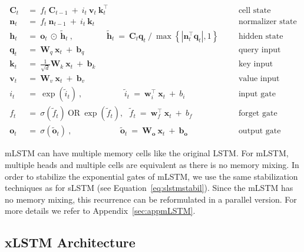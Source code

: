 \begin{align}
\label{eq:mlstm_recurrent_begin}
\mathbf{C}_t \ &= \  f_t \ \mathbf{C}_{t-1} \ + \ 
  i_t \ \mathbf{v}_t \ \mathbf{k}_t^\top & &  &\text{cell state} \\
\mathbf{n}_t \ &= \  f_t \ \mathbf{n}_{t-1} \ + \ 
  i_t \ \mathbf{k}_t & &  &\text{normalizer state} \\
\mathbf{h}_t  \ &= \ \mathbf{o}_t \ \odot \ \tilde{\mathbf{h}}_t
\ , \qquad \qquad 
\tilde{\mathbf{h}}_t \ = \   \mathbf{C}_t \mathbf{q}_t \ / \ 
  \max \left\{ |\mathbf{n}_t^\top \mathbf{q}_t|, 1 \right\} 
   &&&\text{hidden state} \\
\mathbf{q}_t \ &= \ \mathbf{W}_q \ \mathbf{x}_t \ + \ \mathbf{b}_q  & &  &\text{query input} \\
\mathbf{k}_t \ &= \ \frac{1}{\sqrt{d}} \mathbf{W}_k \ \mathbf{x}_t \ + \ \mathbf{b}_k  & &  &\text{key input} \\
\mathbf{v}_t \ &= \ \mathbf{W}_v \ \mathbf{x}_t \ + \ \mathbf{b}_v  & &  &\text{value input} \\
i_t \ &= \ \!\exp \!  \! \left( \tilde{i}_t  \right) \ , 
 \qquad \qquad \ \ \ \ \,
  \tilde{i}_t \ = \ \mathbf{w}^\top_{i} \ \mathbf{x}_t \ + \  b_{i} \ \ \ 
  &&&\text{input gate} \\
f_t \ &= \ \sigma \!  \left(  \tilde{f}_t \right) \ \text{OR} \ \!\exp \!  \! \left(  \tilde{f}_t \right) , \ \ \: \!
\tilde{f}_t \ = \ \mathbf{w}^\top_{f} \ \mathbf{x}_t  \ + \
  b_{f}
  &&& \text{forget gate} \\
\label{eq:mlstm_recurrent_end}
\mathbf{o}_t \ &= \ \sigma \left( \tilde{\mathbf{o}}_t \right) \ , \qquad \qquad \quad \ \ \ \,
  \tilde{\mathbf{o}}_t  \ = \ \mathbf{W}_{\mathbf{o}} \ \mathbf{x}_t \ + \
  \mathbf{b}_{\mathbf{o}}
  &&&\text{output gate} 
\end{align}

mLSTM can have multiple memory cells like the original LSTM. For mLSTM, multiple heads and multiple cells are equivalent as there is no memory mixing. In order to stabilize the exponential gates of mLSTM, we use the same stabilization techniques as for sLSTM (see Equation~\ref{eq:slstmstabil}). 
Since the mLSTM has no memory mixing, this recurrence can be reformulated in a parallel version. For more details we refer to Appendix~\ref{sec:appmLSTM}.

\subsection{xLSTM Architecture}
\label{sec:xLSTMarch}

